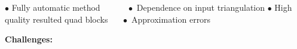 \documentclass[a0paper,portrait, fontscale=0.30]{baposter}
\begin{document}
\begin{poster}
{\begin{minipage}[b]{1\linewidth}
\begin{tcolorbox}[colframe=gray,boxrule=0.01pt,left=0mm,right=0mm,title=\Large $\ \ \ \ \ \ \ \ \ \ \ \ \ \ \ \ \ $Objectives $\ \ \ \ \ \ \ \ \ \ \ \ \ \ \ \ \ \ \ \ $Limitations$\ \ \ \ \ \ \ \ \ \ \ \ \ \ \ \ \ $]
\vspace{-0.1cm}\noindent
$\bullet$ Fully automatic method  $\ \ \ \ \ \ \ \ \ \ \ \ \ \bullet$  Dependence on input triangulation%
\newline
$\bullet$ High quality resulted quad blocks $\ \ \ \ \ \ \bullet$ Approximation errors%
\vspace{-0.1cm}
\end{tcolorbox}
\end{minipage}
\begin{minipage}[b]{1\linewidth}
\begin{tcolorbox}[colframe=gray,boxrule=0.01pt,left=0mm,right=0mm,title=\Large Continuous Strategies]
\vspace{-0.1cm}
\noindent
 \textbf{Challenges:}
\vspace{-0.3cm}
\end{tcolorbox}
\vspace{-0.2cm}
\end{minipage}
\captionsetup{labelformat=empty}

}
\end{poster}
\end{document}
